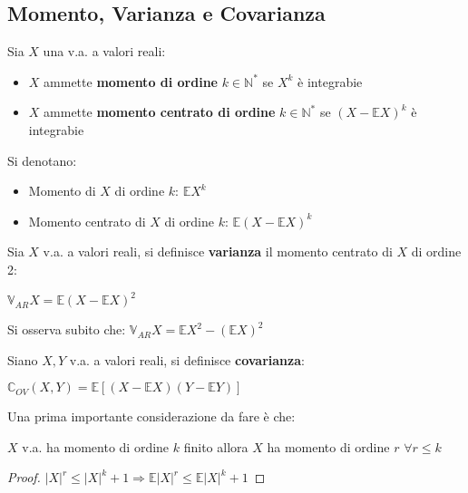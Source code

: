 \subsection{Momento, Varianza e Covarianza}

\begin{definition}
Sia $X$ una v.a. a valori reali: 
\begin{itemize}
    \item $X$ ammette \textbf{momento di ordine} $k\in\mathbb{N}^*$ se $X^k$ è integrabie
    \item $X$ ammette \textbf{momento centrato di ordine} $k\in\mathbb{N}^*$ se $(X-\mathbb{E}X)^k$ è integrabie
\end{itemize}
Si denotano:
\begin{itemize}
    \item Momento di $X$ di ordine $k$: $\mathbb{E}X^k$
    \item Momento centrato di $X$ di ordine $k$: $\mathbb{E}(X-\mathbb{E}X)^k$
\end{itemize}
\end{definition}

\vspace{10px}

\begin{definition}
Sia $X$ v.a. a valori reali, si definisce \textbf{varianza} il momento centrato di $X$ di ordine 2:
\begin{center}
    $\mathbb{V}_{AR}X=\mathbb{E}(X-\mathbb{E}X)^2$
\end{center}
\end{definition}
\vspace{5px}
\noindent
Si osserva subito che: $\mathbb{V}_{AR}X=\mathbb{E}X^2-(\mathbb{E}X)^2$

\vspace{10px}

\begin{definition}
Siano $X,Y$ v.a. a valori reali, si definisce \textbf{covarianza}:
\begin{center}
    $\mathbb{C}_{OV}(X,Y)=\mathbb{E}[(X-\mathbb{E}X)(Y-\mathbb{E}Y)]$
\end{center}
\end{definition}

\vspace{15px}

\noindent
Una prima importante considerazione da fare è che:

\begin{proposition}
$X$ v.a. ha momento di ordine $k$ finito allora $X$ ha momento di ordine $r$ \hspace{3px} $\forall r\leq k$ 
\begin{proof}
$|X|^r\leq|X|^k+1 \Rightarrow \mathbb{E}|X|^r\leq\mathbb{E}|X|^k+1$ 
\end{proof}
\end{proposition}

